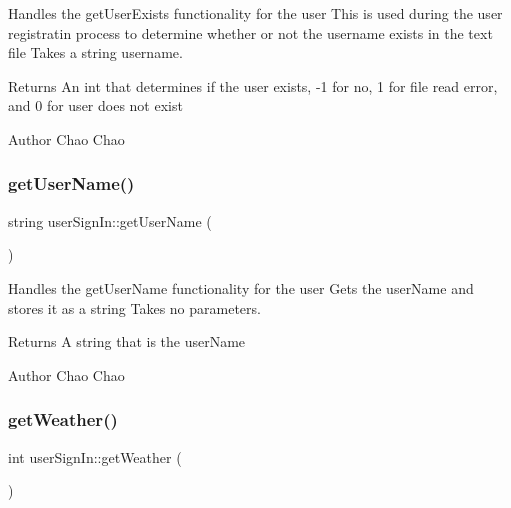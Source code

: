 Handles the get\+User\+Exists functionality for the user  This is used during the user registratin process to determine whether or not the username exists in the text file  Takes a string username. 

\begin{DoxyReturn}{Returns}
An int that determines if the user exists, -\/1 for no, 1 for file read error, and 0 for user does not exist 
\end{DoxyReturn}
\begin{DoxyAuthor}{Author}
Chao Chao 
\end{DoxyAuthor}
\mbox{\label{classuser_sign_in_a55ce850b1e8384f006864a8ba337b73a}} 
\subsubsection{\texorpdfstring{get\+User\+Name()}{getUserName()}}
{\footnotesize\ttfamily string user\+Sign\+In\+::get\+User\+Name (\begin{DoxyParamCaption}{ }\end{DoxyParamCaption})}



Handles the get\+User\+Name functionality for the user  Gets the user\+Name and stores it as a string  Takes no parameters. 

\begin{DoxyReturn}{Returns}
A string that is the user\+Name 
\end{DoxyReturn}
\begin{DoxyAuthor}{Author}
Chao Chao 
\end{DoxyAuthor}
\mbox{\label{classuser_sign_in_a1b7a9edee0062900153cbba2162e65da}} 
\subsubsection{\texorpdfstring{get\+Weather()}{getWeather()}}
{\footnotesize\ttfamily int user\+Sign\+In\+::get\+Weather (\begin{DoxyParamCaption}{ }\end{DoxyParamCaption})}



